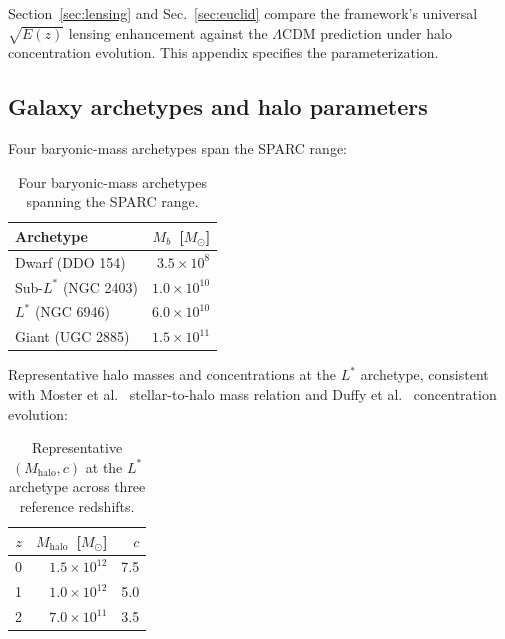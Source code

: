 \documentclass[
    aps,
    prd,
    reprint,
    superscriptaddress,
    nofootinbib,
    floatfix
]{revtex4-2}
\begin{document}
Section~\ref{sec:lensing} and Sec.~\ref{sec:euclid} compare the
framework's universal $\sqrt{E(z)}$ lensing enhancement against the
$\Lambda$CDM prediction under halo concentration evolution. This
appendix specifies the parameterization.

\subsection{Galaxy archetypes and halo parameters}
\label{app:lensing-archetypes}

Four baryonic-mass archetypes span the SPARC range:

\begin{table}[h]
\caption{\label{tab:archetypes-app}Four baryonic-mass archetypes
spanning the SPARC range.}
\begin{ruledtabular}
\begin{tabular}{lr}
Archetype & $M_b$~[$M_\odot$] \\
\hline
Dwarf (DDO 154)         & $3.5 \times 10^{8}$  \\
Sub-$L^*$ (NGC 2403)    & $1.0 \times 10^{10}$ \\
$L^*$ (NGC 6946)        & $6.0 \times 10^{10}$ \\
Giant (UGC 2885)        & $1.5 \times 10^{11}$ \\
\end{tabular}
\end{ruledtabular}
\end{table}

Representative halo masses and concentrations at the $L^*$
archetype, consistent with Moster et al.~\cite{Moster2013}
stellar-to-halo mass relation and Duffy et al.~\cite{Duffy2008}
concentration evolution:

\begin{table}[h]
\caption{\label{tab:halo}Representative $(M_\text{halo}, c)$ at the
$L^*$ archetype across three reference redshifts.}
\begin{ruledtabular}
\begin{tabular}{rrr}
$z$ & $M_\text{halo}$~[$M_\odot$] & $c$ \\
\hline
0 & $1.5 \times 10^{12}$ & 7.5 \\
1 & $1.0 \times 10^{12}$ & 5.0 \\
2 & $7.0 \times 10^{11}$ & 3.5 \\
\end{tabular}
\end{ruledtabular}
\end{table}
\end{document}
